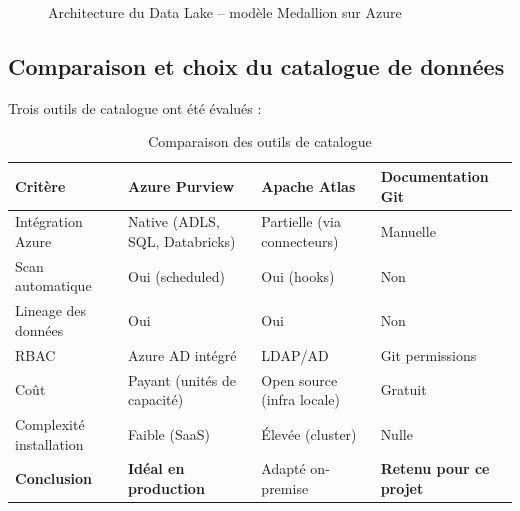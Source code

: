\documentclass[12pt,a4paper]{article}
\begin{document}
\begin{figure}[H]
{
}
\caption{Architecture du Data Lake -- modèle Medallion sur Azure}
\end{figure}

\subsection{Comparaison et choix du catalogue de données}

Trois outils de catalogue ont été évalués :

\begin{table}[H]
\centering
\small
\begin{tabular}{L{3cm} L{3.5cm} L{3.5cm} L{3.5cm}}
  \toprule
  \textbf{Critère} & \textbf{Azure Purview} & \textbf{Apache Atlas} & \textbf{Documentation Git} \\
  \midrule
  Intégration Azure & Native (ADLS, SQL, Databricks) & Partielle (via connecteurs) & Manuelle \\
  Scan automatique & Oui (scheduled) & Oui (hooks) & Non \\
  Lineage des données & Oui & Oui & Non \\
  RBAC & Azure AD intégré & LDAP/AD & Git permissions \\
  Coût & Payant (unités de capacité) & Open source (infra locale) & Gratuit \\
  Complexité installation & Faible (SaaS) & Élevée (cluster) & Nulle \\
  \midrule
  \textbf{Conclusion} & \textbf{Idéal en production} & Adapté on-premise & \textbf{Retenu pour ce projet} \\
  \bottomrule
\end{tabular}
\caption{Comparaison des outils de catalogue}
\end{table}
\end{document}
